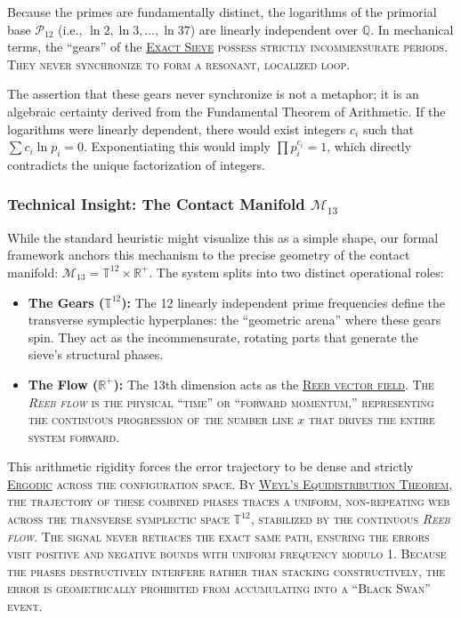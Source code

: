 \documentclass[sn-mathphys-num, pdflatex]{sn-jnl}
\newcommand{\gterm}[2]{\begingroup\normalfont\scshape\hyperlink{#1}{#2}\endgroup}
\begin{document}
Because the primes are fundamentally distinct, the logarithms of the primorial base $\mathcal{P}_{12}$ (i.e., $\ln 2, \ln 3, \dots, \ln 37$) are linearly independent over $\mathbb{Q}$. In mechanical terms, the ``gears'' of the \gterm{exact_sieve}{Exact Sieve} possess strictly incommensurate periods. They never synchronize to form a resonant, localized loop. 

The assertion that these gears never synchronize is not a metaphor; it is an algebraic certainty derived from the Fundamental Theorem of Arithmetic. If the logarithms were linearly dependent, there would exist integers $c_i$ such that $\sum c_i \ln p_i = 0$. Exponentiating this would imply $\prod p_i^{c_i} = 1$, which directly contradicts the unique factorization of integers.

\subsubsection*{Technical Insight: The Contact Manifold $\mathcal{M}_{13}$}
While the standard heuristic might visualize this as a simple shape, our formal framework anchors this mechanism to the precise geometry of the contact manifold: $\mathcal{M}_{13} = \mathbb{T}^{12} \times \mathbb{R}^+$. The system splits into two distinct operational roles:
\begin{itemize}
    \item \textbf{The Gears ($\mathbb{T}^{12}$):} The 12 linearly independent prime frequencies define the transverse symplectic hyperplanes: the ``geometric arena'' where these gears spin. They act as the incommensurate, rotating parts that generate the sieve's structural phases.  
    \item \textbf{The Flow ($\mathbb{R}^+$):} The 13th dimension acts as the \gterm{reeb}{Reeb vector field}. The \textit{Reeb flow} is the physical ``time'' or ``forward momentum,'' representing the continuous progression of the number line $x$ that drives the entire system forward.
\end{itemize}

This arithmetic rigidity forces the error trajectory to be dense and strictly \gterm{ergodic}{Ergodic} across the configuration space. By \gterm{weyl}{Weyl's Equidistribution Theorem}, the trajectory of these combined phases traces a uniform, non-repeating web across the transverse symplectic space $\mathbb{T}^{12}$, stabilized by the continuous \textit{Reeb flow}. The signal never retraces the exact same path, ensuring the errors visit positive and negative bounds with uniform frequency modulo 1. Because the phases destructively interfere rather than stacking constructively, the error is geometrically prohibited from accumulating into a ``Black Swan'' event.
\end{document}
